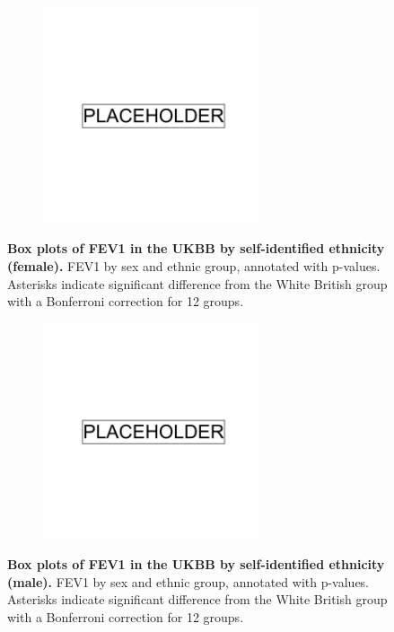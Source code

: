 \begin{figure}
    \centering
    \begin{subfigure}{\textwidth}
    \includegraphics[width=0.7\textwidth]{placeholder.png}
    \end{subfigure}
    \caption[Box plots of FEV1 in the UKBB by self-identified ethnicity (female)]{\textbf{Box plots of FEV1 in the UKBB by self-identified ethnicity (female).} FEV1 by sex and ethnic group, annotated with p-values. Asterisks indicate significant difference from the White British group with a Bonferroni correction for 12 groups.}
    \label{fig:supp_box_fev_f}
\end{figure}

\newpage

\begin{figure}
    \centering
    \begin{subfigure}{\textwidth}
    \includegraphics[width=0.7\textwidth]{placeholder.png}
    \end{subfigure}
    \caption[Box plots of FEV1 in the UKBB by self-identified ethnicity (male)]{\textbf{Box plots of FEV1 in the UKBB by self-identified ethnicity (male).} FEV1 by sex and ethnic group, annotated with p-values. Asterisks indicate significant difference from the White British group with a Bonferroni correction for 12 groups.}
    \label{fig:supp_box_fev_m}
\end{figure}

